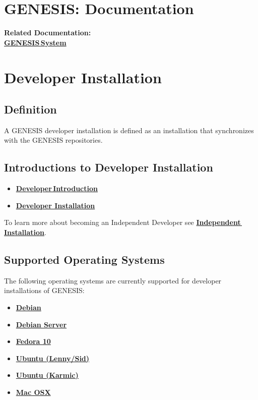\documentclass[12pt]{article}
\begin{document}
\section*{GENESIS: Documentation}

{\bf Related Documentation:} \\
\href{../genesis-system/genesis-system.tex}{\bf GENESIS\,System}

\section*{Developer Installation}

\subsection*{Definition}

A GENESIS developer installation is defined as an installation that synchronizes with the GENESIS repositories.

\subsection*{Introductions to Developer Installation}

\begin{itemize}
   \item[]\href{../developer-intro/developer-intro.tex}{\bf Developer\,Introduction}
   \item[]\href{../installation-developer/installation-developer.tex}{\bf Developer Installation}
\end{itemize}
To learn more about becoming an Independent Developer see \href{../installation-independent/installation-independent.tex}{\bf Independent\,Installation}.

\subsection*{Supported Operating Systems}

The following operating systems are currently supported for developer installations of GENESIS:

\begin{itemize}
   \item[]\href{../installation-debian/installation-debian.tex}{\bf Debian}
   \item[]\href{../installation-debian-server/installation-debian-server.tex}{\bf Debian Server}
   \item[]\href{../installation-fedora10/installation-fedora10.tex}{\bf Fedora 10}
   \item[]\href{../installation-ubuntu-lennysid/installation-ubuntu-lennysid.tex}{\bf Ubuntu (Lenny/Sid)}
   \item[]\href{../installation-ubuntu-karmic/installation-ubuntu-karmic.tex}{\bf Ubuntu (Karmic)}
   \item[]\href{../installation-osx/installation-osx.tex}{\bf Mac OSX}
\end{itemize}
\end{document}
